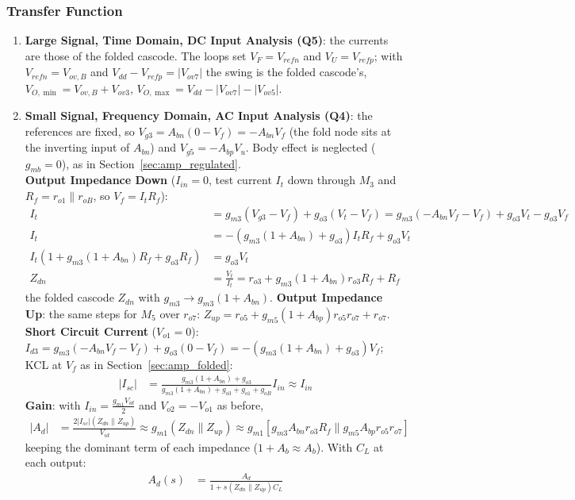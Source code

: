 \subsubsection{Transfer Function}
\begin{enumerate}
  \item \textbf{Large Signal, Time Domain, DC Input Analysis (Q5)}: the
    currents are those of the folded cascode. The loops set \(V_F = V_{refn}\)
    and \(V_U = V_{refp}\); with \(V_{refn} = V_{ov,B}\) and
    \(V_{dd} - V_{refp} = |V_{ov7}|\) the swing is the folded cascode's,
    \(V_{O,\min} = V_{ov,B} + V_{ov3}\), \(V_{O,\max} = V_{dd} - |V_{ov7}| - |V_{ov5}|\).
  \item \textbf{Small Signal, Frequency Domain, AC Input Analysis (Q4)}: the
    references are fixed, so \(V_{g3} = A_{bn}(0 - V_f) = -A_{bn} V_f\) (the fold node
    sits at the inverting input of \(A_{bn}\)) and \(V_{g5} = -A_{bp} V_u\). Body
    effect is neglected (\(g_{mb} = 0\)), as in Section~\ref{sec:amp_regulated}.\\
    \textbf{Output Impedance Down} (\(I_{in} = 0\), test current \(I_t\) down through
    \(M_3\) and \(R_f = r_{o1} \parallel r_{oB}\), so \(V_f = I_t R_f\)):
    \begin{align*}
      I_t &= g_{m3}(V_{g3} - V_f) + g_{o3}(V_t - V_f) = g_{m3}(-A_{bn} V_f - V_f) + g_{o3} V_t - g_{o3} V_f \\
      I_t &= -\left(g_{m3}(1 + A_{bn}) + g_{o3}\right) I_t R_f + g_{o3} V_t \\
      I_t\left(1 + g_{m3}(1 + A_{bn}) R_f + g_{o3} R_f\right) &= g_{o3} V_t \\
      Z_{dn} &= \frac{V_t}{I_t} = r_{o3} + g_{m3}(1 + A_{bn}) r_{o3} R_f + R_f
    \end{align*}
    the folded cascode \(Z_{dn}\) with \(g_{m3} \to g_{m3}(1 + A_{bn})\).
    \textbf{Output Impedance Up}: the same steps for \(M_5\) over \(r_{o7}\):
    \(Z_{up} = r_{o5} + g_{m5}(1 + A_{bp}) r_{o5} r_{o7} + r_{o7}\).\\
    \textbf{Short Circuit Current} (\(V_{o1} = 0\)): \(I_{d3} = g_{m3}(-A_{bn} V_f - V_f) + g_{o3}(0 - V_f) = -\left(g_{m3}(1 + A_{bn}) + g_{o3}\right) V_f\);
    KCL at \(V_f\) as in Section~\ref{sec:amp_folded}:
    \begin{align*}
      |I_{sc}| &= \frac{g_{m3}(1 + A_{bn}) + g_{o3}}{g_{m3}(1 + A_{bn}) + g_{o3} + g_{o1} + g_{oB}} I_{in} \approx I_{in}
    \end{align*}
    \textbf{Gain}: with \(I_{in} = \frac{g_{m1} V_{id}}{2}\) and \(V_{o2} = -V_{o1}\) as before,
    \begin{align*}
      |A_d| &= \frac{2 |I_{sc}| (Z_{dn} \parallel Z_{up})}{V_{id}} \approx g_{m1}(Z_{dn} \parallel Z_{up})
             \approx g_{m1}\left[g_{m3} A_{bn} r_{o3} R_f \parallel g_{m5} A_{bp} r_{o5} r_{o7}\right]
    \end{align*}
    keeping the dominant term of each impedance (\(1 + A_b \approx A_b\)). With \(C_L\) at each output:
    \begin{align*}
      A_d(s) &= \frac{A_d}{1 + s (Z_{dn} \parallel Z_{up}) C_L} \tag{1}
    \end{align*}
\end{enumerate}

